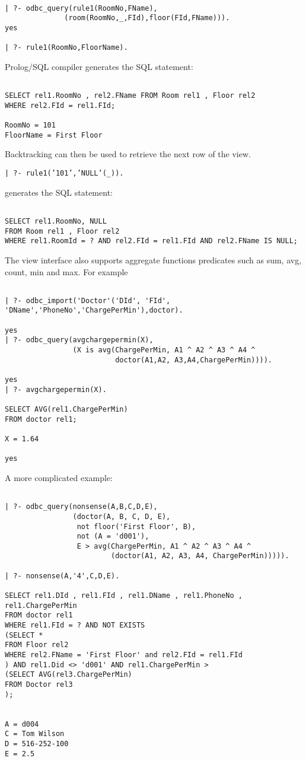\begin{verbatim}
	
| ?- odbc_query(rule1(RoomNo,FName),
	          (room(RoomNo,_,FId),floor(FId,FName))).
yes

| ?- rule1(RoomNo,FloorName).
\end{verbatim}

Prolog/SQL compiler generates the SQL statement:
\begin{verbatim}

SELECT rel1.RoomNo , rel2.FName FROM Room rel1 , Floor rel2 
WHERE rel2.FId = rel1.FId;

RoomNo = 101
FloorName = First Floor
\end{verbatim}

Backtracking can then be used to retrieve the next row of the view.
\begin{center}

{\tt | ?- rule1('101','NULL'(\_)).}
\end{center}

generates the SQL statement:
\begin{verbatim}

SELECT rel1.RoomNo, NULL
FROM Room rel1 , Floor rel2
WHERE rel1.RoomId = ? AND rel2.FId = rel1.FId AND rel2.FName IS NULL;
\end{verbatim}

The view interface also supports aggregate functions predicates such as sum, avg,
count, min and max.  For example
\begin{verbatim}

| ?- odbc_import('Doctor'('DId', 'FId', 'DName','PhoneNo','ChargePerMin'),doctor).

yes
| ?- odbc_query(avgchargepermin(X),
                (X is avg(ChargePerMin, A1 ^ A2 ^ A3 ^ A4 ^ 
                          doctor(A1,A2, A3,A4,ChargePerMin)))).

yes
| ?- avgchargepermin(X).

SELECT AVG(rel1.ChargePerMin)
FROM doctor rel1;

X = 1.64

yes
\end{verbatim}


A more complicated example:
\begin{verbatim}

| ?- odbc_query(nonsense(A,B,C,D,E),
                (doctor(A, B, C, D, E), 
                 not floor('First Floor', B), 
                 not (A = 'd001'), 
                 E > avg(ChargePerMin, A1 ^ A2 ^ A3 ^ A4 ^
                         (doctor(A1, A2, A3, A4, ChargePerMin))))).

| ?- nonsense(A,'4',C,D,E).

SELECT rel1.DId , rel1.FId , rel1.DName , rel1.PhoneNo , rel1.ChargePerMin
FROM doctor rel1
WHERE rel1.FId = ? AND NOT EXISTS
(SELECT *
FROM Floor rel2
WHERE rel2.FName = 'First Floor' and rel2.FId = rel1.FId
) AND rel1.Did <> 'd001' AND rel1.ChargePerMin >
(SELECT AVG(rel3.ChargePerMin)
FROM Doctor rel3
);


A = d004
C = Tom Wilson
D = 516-252-100
E = 2.5
\end{verbatim}

